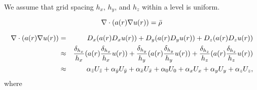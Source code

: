 \documentclass[10pt]{article}
\begin{document}
We assume that grid spacing $h_x$, $h_y$, and $h_z$ within a level is uniform.

\begin{center}
\begin{minipage}{1.5in}
\end{minipage} \[ \nabla\cdot(a(r) \nabla u(r)) = \bar{\rho} \]
\end{center}


 \begin{eqnarray*}
 \nabla\cdot(a(r) \nabla u(r)) & = & D_x (a(r) D_x u(r)) + D_y (a(r) D_y u(r)) + D_z (a(r) D_z u(r)) \\
 & \approx & \frac{\delta_{h_x}}{h_x} (a(r) \frac{\delta_{h_x}}{h_x} u(r)) + 
             \frac{\delta_{h_y}}{h_y} (a(r) \frac{\delta_{h_y}}{h_y} u(r)) + 
             \frac{\delta_{h_z}}{h_z} (a(r) \frac{\delta_{h_z}}{h_z} u(r)) \\
 & \approx & \alpha_{\bar{z}}U_{\bar{z}} +  \alpha_{\bar{y}}U_{\bar{y}} +  \alpha_{\bar{x}}U_{\bar{x}} 
  +  \alpha_{0}U_{0} 
  +  \alpha_{x}U_{x} +  \alpha_{y}U_{y} +  \alpha_{z}U_{z},
 \end{eqnarray*}
where
\end{document}
